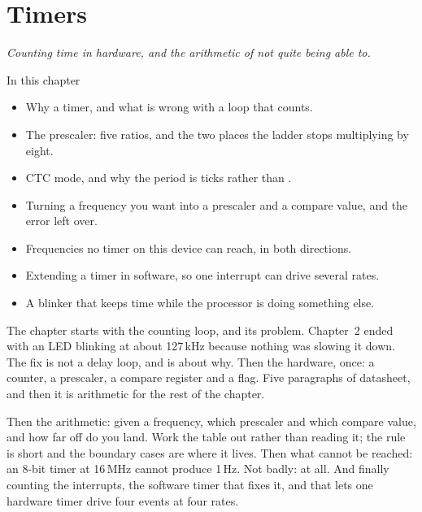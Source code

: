 
\chapter{Timers}
\label{c5:ch:timers}

{\large\itshape Counting time in hardware, and the arithmetic of not quite being able to.\par}

\begin{chapterbox}{In this chapter}
\begin{itemize}
  \item Why a timer, and what is wrong with a loop that counts.
  \item The prescaler: five ratios, and the two places the ladder stops multiplying by eight.
  \item CTC mode, and why the period is  ticks rather than .
  \item Turning a frequency you want into a prescaler and a compare value, and the error left
    over.
  \item Frequencies no timer on this device can reach, in both directions.
  \item Extending a timer in software, so one interrupt can drive several rates.
  \item A blinker that keeps time while the processor is doing something else.
\end{itemize}
\end{chapterbox}

The chapter starts with the counting loop, and its problem. Chapter~2 ended with an LED blinking at
about 127\,kHz because nothing was slowing it down. The fix is not a delay loop, and
 is about why. Then the hardware, once: a counter, a prescaler, a compare
register and a flag. Five paragraphs of datasheet, and then it is arithmetic for the rest of the
chapter.

Then the arithmetic: given a frequency, which prescaler and which compare value, and how far off
do you land. Work the table out rather than reading it; the rule is short and the boundary cases
are where it lives. Then what cannot be reached: an 8-bit timer at 16\,MHz cannot produce 1\,Hz.
Not badly: at all. And finally counting the interrupts, the software timer that fixes it, and that
lets one hardware timer drive four events at four rates.

